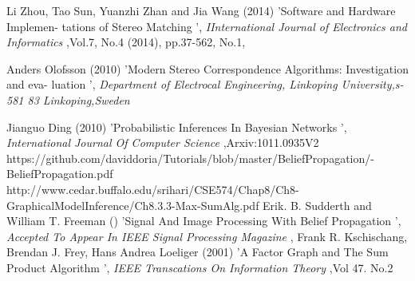 \documentclass{singlecol-new}
\theoremstyle{TH}{
\newtheorem{lemma}{Lemma}
\newtheorem{theorem}[lemma]{Theorem}
\newtheorem{corrolary}[lemma]{Corrolary}
\newtheorem{conjecture}[lemma]{Conjecture}
\newtheorem{proposition}[lemma]{Proposition}
\newtheorem{claim}[lemma]{Claim}
\newtheorem{stheorem}[lemma]{Wrong Theorem}
\newtheorem{algorithm}{Algorithm}
}
\theoremstyle{THrm}{
\newtheorem{definition}{Definition}[section]
\newtheorem{question}{Question}[section]
\newtheorem{remark}{Remark}
\newtheorem{scheme}{Scheme}
}
\theoremstyle{THhit}{
\newtheorem{case}{Case}[section]
}
\begin{document}
\begin{thebibliography}{10}
	Li Zhou, Tao Sun, Yuanzhi Zhan and Jia Wang                                                                                                                 (2014) 'Software and Hardware Implemen- tations  of  Stereo  Matching                                                                                                           ', {\it IInternational  Journal  of  Electronics  and  Informatics                                                   },Vol.7, No.4 (2014), pp.37-562, No.1,

Anders  Olofsson                                                                                                                 (2010) 'Modern  Stereo  Correspondence  Algorithms: Investigation  and  eva- luation                                                                                                           ', {\it  Department  of  Electrocal  Engineering, Linkoping  University,s-581  83  Linkoping,Sweden }

Jianguo Ding                                                                                                                 (2010) 'Probabilistic Inferences In Bayesian Networks                         ', {\it International Journal Of Computer Science                                                    },Arxiv:1011.0935V2
https://github.com/daviddoria/Tutorials/blob/master/BeliefPropagation/- BeliefPropagation.pdf
http://www.cedar.buffalo.edu/srihari/CSE574/Chap8/Ch8- GraphicalModelInference/Ch8.3.3-Max-SumAlg.pdf              	Erik. B. Sudderth and William T. Freeman                                                                                                                 () 'Signal And Image Processing With Belief Propagation                                                                                                           ', {\it Accepted To Appear In IEEE Signal Processing Magazine                                                    }, 
	Frank R. Kschischang, Brendan J. Frey, Hans Andrea Loeliger                                                                                                                 (2001) 'A Factor Graph and The Sum Product Algorithm                                                                                                         ', {\it IEEE Transcations On Information Theory                                                    },Vol 47. No.2


\end{thebibliography}
\end{document}
